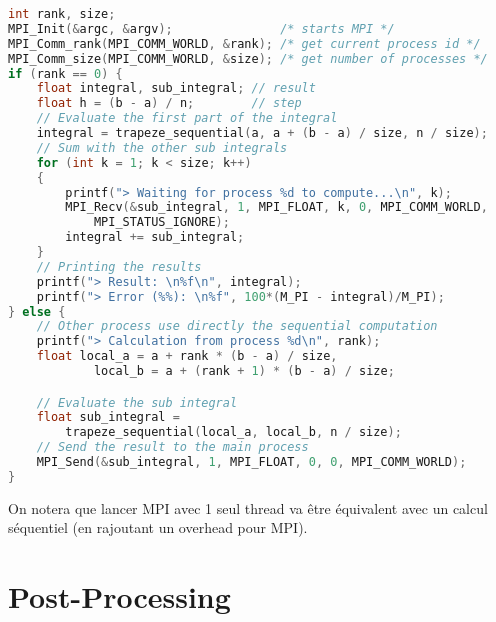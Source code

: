 \documentclass{article}
\begin{document}
\begin{lstlisting}[language=C, morekeywords={f, MPI_Recv, MPI_Send, trapeze_sequential}]
int rank, size;
MPI_Init(&argc, &argv);               /* starts MPI */
MPI_Comm_rank(MPI_COMM_WORLD, &rank); /* get current process id */
MPI_Comm_size(MPI_COMM_WORLD, &size); /* get number of processes */
if (rank == 0) {
    float integral, sub_integral; // result
    float h = (b - a) / n;        // step
    // Evaluate the first part of the integral
    integral = trapeze_sequential(a, a + (b - a) / size, n / size);
    // Sum with the other sub integrals
    for (int k = 1; k < size; k++)
    {
        printf("> Waiting for process %d to compute...\n", k);
        MPI_Recv(&sub_integral, 1, MPI_FLOAT, k, 0, MPI_COMM_WORLD,
            MPI_STATUS_IGNORE);
        integral += sub_integral;
    }
    // Printing the results
    printf("> Result: \n%f\n", integral);
    printf("> Error (%%): \n%f", 100*(M_PI - integral)/M_PI);
} else {
    // Other process use directly the sequential computation
    printf("> Calculation from process %d\n", rank);
    float local_a = a + rank * (b - a) / size,
            local_b = a + (rank + 1) * (b - a) / size;

    // Evaluate the sub integral
    float sub_integral =
        trapeze_sequential(local_a, local_b, n / size);
    // Send the result to the main process
    MPI_Send(&sub_integral, 1, MPI_FLOAT, 0, 0, MPI_COMM_WORLD);
}
\end{lstlisting}

On notera que lancer MPI avec 1 seul thread va être équivalent avec un calcul séquentiel (en rajoutant un overhead pour MPI).

\newpage

\section{Post-Processing}
\end{document}
